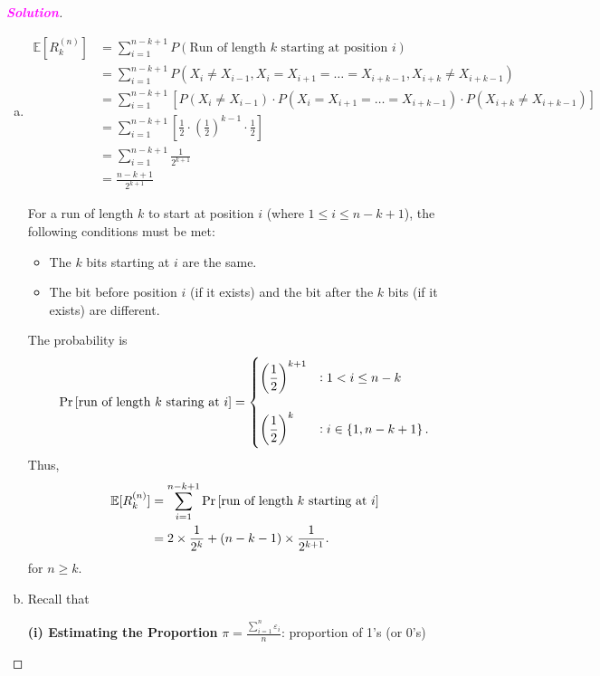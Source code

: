 \documentclass[12pt,openany]{book}
\theoremstyle{definition}
\newcommand{\E}{\mathbb{E}}
\newcommand{\sol}{\textcolor{magenta}{\bf Solution}}
\newcommand{\of}[1]{\left(#1\right)}
\begin{document}
\newpage
\begin{proof}[\sol]
	\ \begin{enumerate}[(a)]
		\item 
		\begin{align*}
			\mathbb{E}[R_k^{(n)}] &= \sum_{i=1}^{n-k+1} P(\text{Run of length } k \text{ starting at position } i) \\
			&= \sum_{i=1}^{n-k+1} P(X_i \neq X_{i-1}, X_i = X_{i+1} = \dots = X_{i+k-1}, X_{i+k} \neq X_{i+k-1}) \\
			&= \sum_{i=1}^{n-k+1} \left[ P(X_i \neq X_{i-1}) \cdot P(X_i = X_{i+1} = \dots = X_{i+k-1}) \cdot P(X_{i+k} \neq X_{i+k-1}) \right] \\
			&= \sum_{i=1}^{n-k+1} \left[ \frac{1}{2} \cdot \left(\frac{1}{2}\right)^{k-1} \cdot \frac{1}{2} \right] \\
			&= \sum_{i=1}^{n-k+1} \frac{1}{2^{k+1}} \\
			&= \frac{n-k+1}{2^{k+1}}
		\end{align*}
		
		For a run of length $k$ to start at position $i$ (where $1 \leq i \leq n-k+1$), the following conditions must be met:
		\begin{itemize}
			\item The $k$ bits starting at $i$ are the same.
			\item The bit before position $i$ (if it exists) and the bit after the $k$ bits (if it exists) are different.
		\end{itemize}
		The probability is \[
		\Pr\sbr{\text{run of length $k$ staring at $i$}}=\begin{cases}
			\displaystyle\of{\frac{1}{2}}^{k+1} &:1<i\leq n-k\\
			\\
			\displaystyle\of{\frac{1}{2}}^k &:i\in\set{1,n-k+1}.
		\end{cases}
		\] Thus, \begin{align*}
			\E[R_k^{(n)}] &= \sum_{i=1}^{n-k+1} \Pr\sbr{\text{run of length } k \text{ starting at } i}\\
			&= 2 \times \frac{1}{2^k} + (n-k-1) \times \frac{1}{2^{k+1}}.
		\end{align*}
		for $n \geq k$.
		\item Recall that
	
		\begin{tcolorbox}[colback=white,colframe=lemcolor,arc=5pt,title={\color{white}\bf Runs Test}]
		\textbf{(i) Estimating the Proportion} \(\displaystyle \pi=\frac{\sum_{i=1}^{n} \varepsilon_i}{n} \): proportion of 1's (or 0's)
		

\end{tcolorbox}
\end{enumerate}
\end{proof}
\end{document}
